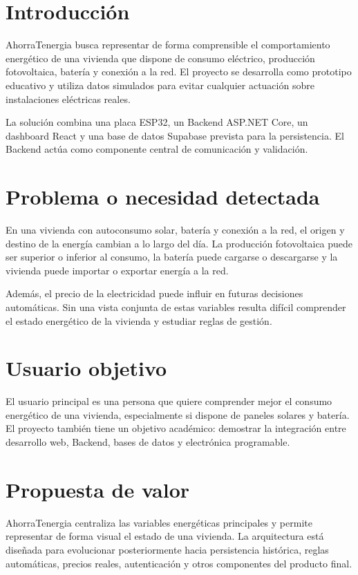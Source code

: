 \documentclass[11pt,a4paper,oneside]{report}
\begin{document}
\section{Introducción}

AhorraTenergia busca representar de forma comprensible el comportamiento energético de una vivienda que dispone de consumo eléctrico, producción fotovoltaica, batería y conexión a la red. El proyecto se desarrolla como prototipo educativo y utiliza datos simulados para evitar cualquier actuación sobre instalaciones eléctricas reales.

La solución combina una placa ESP32, un Backend ASP.NET Core, un dashboard React y una base de datos Supabase prevista para la persistencia. El Backend actúa como componente central de comunicación y validación.

\section{Problema o necesidad detectada}

En una vivienda con autoconsumo solar, batería y conexión a la red, el origen y destino de la energía cambian a lo largo del día. La producción fotovoltaica puede ser superior o inferior al consumo, la batería puede cargarse o descargarse y la vivienda puede importar o exportar energía a la red.

Además, el precio de la electricidad puede influir en futuras decisiones automáticas. Sin una vista conjunta de estas variables resulta difícil comprender el estado energético de la vivienda y estudiar reglas de gestión.

\section{Usuario objetivo}

El usuario principal es una persona que quiere comprender mejor el consumo energético de una vivienda, especialmente si dispone de paneles solares y batería. El proyecto también tiene un objetivo académico: demostrar la integración entre desarrollo web, Backend, bases de datos y electrónica programable.

\section{Propuesta de valor}

AhorraTenergia centraliza las variables energéticas principales y permite representar de forma visual el estado de una vivienda. La arquitectura está diseñada para evolucionar posteriormente hacia persistencia histórica, reglas automáticas, precios reales, autenticación y otros componentes del producto final.
\end{document}
